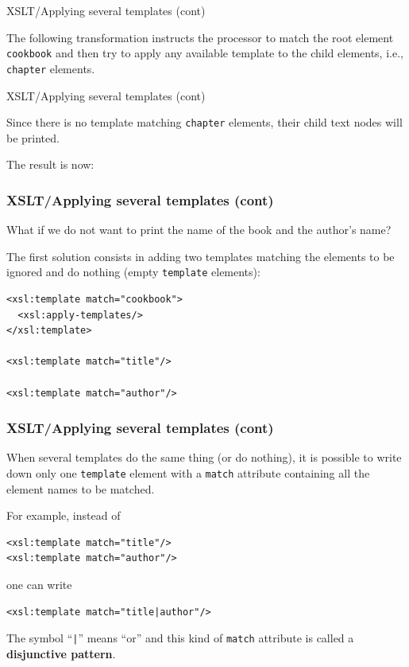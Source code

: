 %
\begin{frame}{XSLT/Applying several templates (cont)}

The following transformation
instructs the \XSLT processor to match the root element
\texttt{cookbook} and then try to apply any available template to the
child elements, i.e., \texttt{chapter} elements.

\end{frame}

%
\begin{frame}{XSLT/Applying several templates (cont)}

Since there is no template matching \texttt{chapter} elements, their
child text nodes will be printed.

\bigskip

The result is now:

\end{frame}

%
\begin{frame}[containsverbatim]
\frametitle{XSLT/Applying several templates (cont)}

What if we do not want to print the name of the book and the author's
name?

\bigskip

The first solution consists in adding two templates matching the
elements to be ignored and do nothing (empty \texttt{template}
elements):
{\small
\begin{verbatim}
<xsl:template match="cookbook">
  <xsl:apply-templates/>
</xsl:template>

<xsl:template match="title"/>

<xsl:template match="author"/>
\end{verbatim}
}

\end{frame}

%
\begin{frame}[containsverbatim]
\frametitle{XSLT/Applying several templates (cont)}

When several templates do the same thing (or do nothing), it is
possible to write down only one \texttt{template} element with a
\texttt{match} attribute containing all the element names to be
matched.

\bigskip

For example, instead of
{\small
\begin{verbatim}
<xsl:template match="title"/>
<xsl:template match="author"/>
\end{verbatim}
}
one can write
{\small
\begin{verbatim}
<xsl:template match="title|author"/>
\end{verbatim}
}
The symbol ``\verb#|#'' means ``or'' and this kind of \texttt{match}
attribute is called a \textbf{disjunctive pattern}.

\end{frame}

